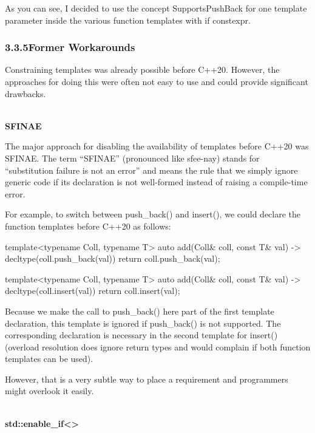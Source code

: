 As you can see, I decided to use the concept SupportsPushBack for one template parameter inside the various function templates with if constexpr.

\subsubsection*{ 3.3.5\hspace{0.2cm}Former Workarounds}

Constraining templates was already possible before C++20. However, the approaches for doing this were often not easy to use and could provide significant drawbacks.

\noindent
\hspace*{\fill} \\ %
\textbf{SFINAE}

The major approach for disabling the availability of templates before C++20 was SFINAE. The term “SFINAE” (pronounced like sfee-nay) stands for “substitution failure is not an error” and means the rule that we simply ignore generic code if its declaration is not well-formed instead of raising a compile-time error.

For example, to switch between push\_back() and insert(), we could declare the function templates before C++20 as follows:

\begin{cpp}
template<typename Coll, typename T>
auto add(Coll& coll, const T& val) -> decltype(coll.push_back(val))
{
	return coll.push_back(val);
}

template<typename Coll, typename T>
auto add(Coll& coll, const T& val) -> decltype(coll.insert(val))
{
	return coll.insert(val);
}
\end{cpp}

Because we make the call to push\_back() here part of the first template declaration, this template is ignored if push\_back() is not supported. The corresponding declaration is necessary in the second template for insert() (overload resolution does ignore return types and would complain if both function templates can be used).

However, that is a very subtle way to place a requirement and programmers might overlook it easily.

\noindent
\hspace*{\fill} \\ %
\textbf{std::enable\_if<>}

